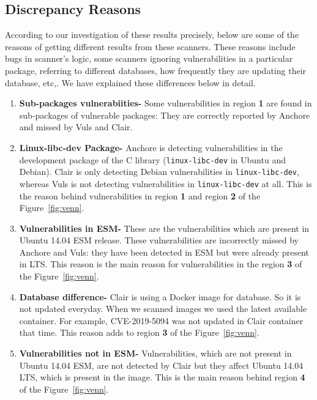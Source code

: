 \subsection{Discrepancy Reasons}
According to our investigation of these results precisely, below are some of the reasons of
getting different results from these scanners. These reasons include bugs in scanner's logic,
some scanners ignoring vulnerabilities in a particular package, referring to different databases,
how frequently they are updating their database, etc,. We have explained these differences below in detail.
\begin{enumerate}
\item\textbf{Sub-packages vulnerabiities-} Some vulnerabilities in region
	        \textbf{1} are found in sub-packages of vulnerable packages: They are
                 correctly reported by Anchore and missed by Vuls and Clair.

\item\textbf{Linux-libc-dev Package-} Anchore is detecting vulnerabilities in the development
                package of the C library (\texttt{linux-libc-dev} in Ubuntu and Debian). Clair is
		only detecting Debian vulnerabilities in \texttt{linux-libc-dev}, whereas Vuls
		is not detecting vulnerabilities in \texttt{linux-libc-dev} at all. This is the
		reason behind vulnerabilities in region \textbf{1} and region \textbf{2} of the
		Figure~\ref{fig:venn}.

\item \textbf{Vulnerabilities in ESM-} These are the vulnerabilities which are present in Ubuntu 14.04
        ESM release. These vulnerabilities are incorrectly missed by Anchore and Vuls: they have been
         detected in ESM but were already present in LTS. This reason is the main reason for vulnerabilities
	in the region \textbf{3} of the Figure~\ref{fig:venn}.
	 
\item\textbf{Database difference-} Clair is using a Docker image for database. So it is not updated everyday.
                When we scanned images we used the latest available container. For example, CVE-2019-5094 was not
		updated in Clair container that time. This reason adds to region \textbf{3} of the 
		Figure~\ref{fig:venn}.

\item\textbf{Vulnerabilities not in ESM-} Vulnerabilities, which are not present in Ubuntu 14.04 ESM,
	are not detected by Clair but they affect Ubuntu 14.04 LTS, which is present in the image. 
		This is the main reason behind region \textbf{4}
		of the Figure~\ref{fig:venn}.


\end{enumerate}
